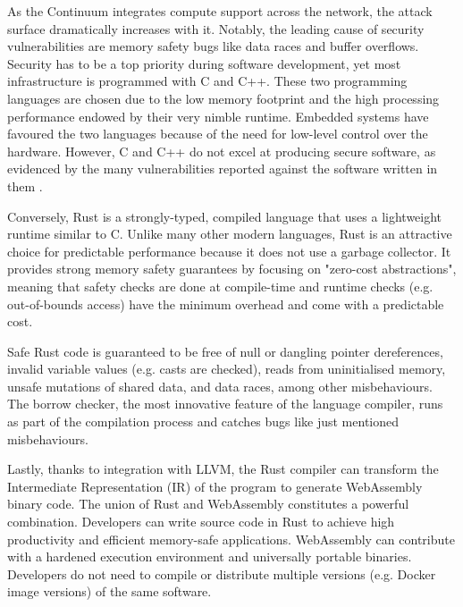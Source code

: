 As the Continuum integrates compute support across the network, the attack surface dramatically increases with it. Notably, the leading cause of security vulnerabilities are memory safety bugs like data races and buffer overflows. Security has to be a top priority during software development, yet most infrastructure is programmed with C and C++. These two programming languages are chosen due to the low memory footprint and the high processing performance endowed by their very nimble runtime. Embedded systems have favoured the two languages because of the need for low-level control over the hardware. However, C and C++ do not excel at producing secure software, as evidenced by the many vulnerabilities reported against the software written in them \cite{cwe}.

Conversely, Rust is a strongly-typed, compiled language that uses a lightweight runtime similar to C. Unlike many other modern languages, Rust is an attractive choice for predictable performance because it does not use a garbage collector. It provides strong memory safety guarantees by focusing on "zero-cost abstractions", meaning that safety checks are done at compile-time and runtime checks (e.g. out-of-bounds access) have the minimum overhead and come with a predictable cost.

Safe Rust code is guaranteed to be free of null or dangling pointer dereferences, invalid variable values (e.g. casts are checked), reads from uninitialised memory, unsafe mutations of shared data, and data races, among other misbehaviours. The borrow checker, the most innovative feature of the language compiler, runs as part of the compilation process and catches bugs like just mentioned misbehaviours. 

Lastly, thanks to integration with LLVM, the Rust compiler can transform the Intermediate Representation (IR) of the program to generate WebAssembly binary code. The union of Rust and WebAssembly constitutes a powerful combination. Developers can write source code in Rust to achieve high productivity and efficient memory-safe applications. WebAssembly can contribute with a hardened execution environment and universally portable binaries. Developers do not need to compile or distribute multiple versions (e.g. Docker image versions) of the same software.


